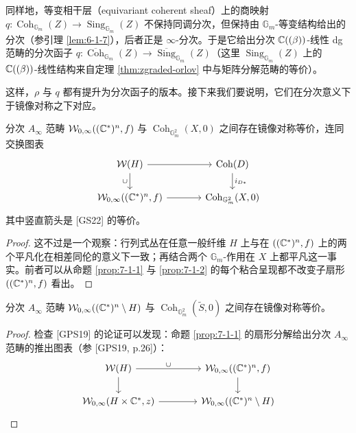 同样地，等变相干层（equivariant coherent sheaf）上的商映射 $q\colon\operatorname{Coh}_{\mathbb G_m}(Z)\to\operatorname{Sing}_{\mathbb G_m}(Z)$ 不保持同调分次，但保持由 $\mathbb G_m$-等变结构给出的分次（参引理 \ref{lem:6-1-7}），后者正是 $\infty$-分次。于是它给出分次 $\mathbb{C}((\beta))$-线性 dg 范畴的分次函子 $q\colon\overline{\operatorname{Coh}}_{\mathbb G_m}(Z)\to\overline{\operatorname{Sing}}_{\mathbb G_m}(Z)$（这里 $\operatorname{Sing}_{\mathbb G_m}(Z)$ 上的 $\mathbb{C}((\beta))$-线性结构来自定理 \ref{thm:zgraded-orlov} 中与矩阵分解范畴的等价）。

这样，$\rho$ 与 $q$ 都有提升为分次函子的版本。接下来我们要说明，它们在分次意义下于镜像对称之下对应。

\begin{lemma}\label{lem:8-3-2}
分次 $A_\infty$ 范畴 $\mathcal{W}_{0,\infty}((\mathbb{C}^*)^n,f)$ 与 $\operatorname{Coh}_{\mathbb G_m^2}(X,0)$ 之间存在镜像对称等价，连同交换图表
\[
\begin{tikzcd}[column sep=3.6em, row sep=1.7em]
\cW(H) \arrow[r] \arrow[d, "\cup"'] & \operatorname{Coh}(D) \arrow[d, "i_{D*}"] \\
\cW_{0,\infty}((\C^*)^n,f) \arrow[r] & \operatorname{Coh}_{\mathbb G_m^2}(X,0)
\end{tikzcd}
\]
其中竖直箭头是 [GS22] 的等价。
\end{lemma}


\begin{proof}
这不过是一个观察：行列式丛在任意一般纤维 $H$ 上与在 $((\mathbb{C}^*)^n,f)$ 上的两个平凡化在相差同伦的意义下一致；再结合两个 $\mathbb G_m$-作用在 $X$ 上都平凡这一事实。前者可以从命题 \ref{prop:7-1-1} 与 \ref{prop:7-1-2} 的每个粘合呈现都不改变子扇形 $((\mathbb{C}^*)^n,f)$ 看出。
\end{proof}


\begin{theorem}\label{thm:8-3-3}
分次 $A_\infty$ 范畴 $\mathcal{W}_{0,\infty}((\mathbb{C}^*)^n\setminus H)$ 与 $\operatorname{Coh}_{\mathbb G_m^2}(\tilde S,0)$ 之间存在镜像对称等价。
\end{theorem}

\begin{proof}
检查 [GPS19] 的论证可以发现：命题 \ref{prop:7-1-1} 的扇形分解给出分次 $A_\infty$ 范畴的推出图表（参 [GPS19, p.26]）：
\[
\begin{tikzcd}[column sep=4.0em, row sep=1.7em]
\cW(H) \arrow[r, "\cup"] \arrow[d] & \cW_{0,\infty}((\C^*)^n,f) \arrow[d] \\
\cW_{0,\infty}(H\times\C^*,z) \arrow[r] & \cW_{0,\infty}((\C^*)^n\setminus H)
\end{tikzcd}
\]
\end{proof}

